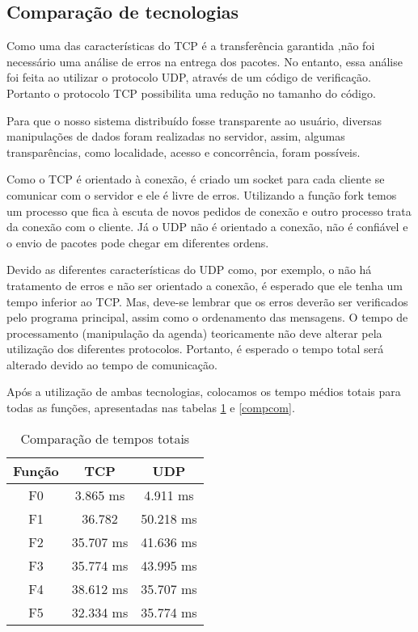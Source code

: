 \documentclass[10pt,a4paper]{article}
\begin{document}
\clearpage

  \subsection{Comparação de tecnologias}
Como uma das características do TCP é a transferência garantida ,não foi necessário uma análise de erros na entrega
dos pacotes. No entanto, essa análise foi feita ao utilizar o protocolo UDP, através de um código de verificação.
Portanto o protocolo TCP possibilita uma redução no tamanho do código.

Para que o nosso sistema distribuído fosse transparente ao usuário, diversas manipulações de dados foram realizadas
no servidor, assim, algumas transparências, como localidade, acesso e concorrência, foram possíveis.

Como o TCP é orientado à conexão, é criado um socket para cada cliente se comunicar com o servidor e ele é livre
de erros. Utilizando a função fork temos um processo que fica à escuta de novos pedidos de conexão e outro processo
trata da conexão com o cliente. Já o UDP não é orientado a conexão, não é confiável e o envio de pacotes pode chegar em
diferentes ordens.

Devido as diferentes características do UDP como, por exemplo, o não há tratamento de erros e não ser orientado a
conexão, é esperado que ele tenha um tempo inferior ao TCP. Mas, deve-se lembrar que os erros deverão ser verificados
pelo programa principal, assim como o ordenamento das mensagens.
O tempo de processamento (manipulação da agenda) teoricamente não deve alterar pela utilização dos diferentes
protocolos.
Portanto, é esperado o tempo total será alterado devido ao tempo de comunicação.

Após a utilização de ambas tecnologias, colocamos os tempo médios totais para todas as funções, apresentadas nas tabelas \ref{comptot} e \ref{compcom}.
\begin{table}[h!]
  \begin{center}
    \begin{tabular}{ccc}
      
      Função& TCP&  UDP \\
      \hline
      F0 & 3.865 ms & 4.911 ms\\
      F1 & 36.782 & 50.218 ms\\
      F2 & 35.707 ms & 41.636 ms\\
      F3 & 35.774 ms & 43.995 ms\\
      F4 & 38.612 ms & 35.707 ms\\
      F5 & 32.334 ms & 35.774 ms
    \end{tabular}
  \end{center}
      \vspace{-5mm}
    \caption{Comparação de tempos totais} \label{comptot}
\end{table}
\end{document}
